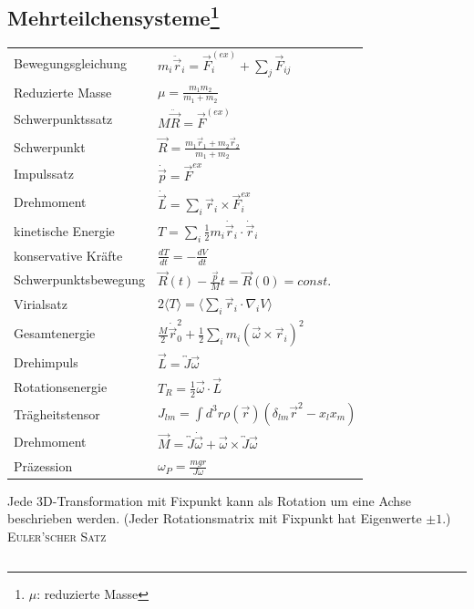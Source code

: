 \documentclass[12pt,a4paper]{article}
\renewcommand{\d}[2]{\frac{d #1}{d #2}}
\renewcommand{\=}[1]{\stackrel{#1}{=}}
\theoremstyle{definition}
\theoremstyle{remark}
\begin{document}
\subsection[Mehrteilchensysteme]{Mehrteilchensysteme\let\thefootnote\relax\footnote{$\mu$: reduzierte Masse}}

\begin{center}
\begin{minipage}[t]{.5\linewidth}
\vspace{0pt}
\begin{tabular}{ll}
Bewegungsgleichung & $m_i \ddot{\vec{r}}_i = \vec{F}_i^{(ex)} + \sum_j \vec{F}_{ij}$\\
Reduzierte Masse & $\mu = \frac{m_1 m_2}{m_1 + m_2}$\\
Schwerpunktssatz & $M \ddot{\vec{R}} = \vec{F}^{(ex)}$\\
Schwerpunkt & $\vec{R} = \frac{m_1 \vec{r}_1 + m_2 \vec{r}_2}{m_1 + m_2}$\\
Impulssatz & $\dot{\vec{p}} = \vec{F}^{ex}$\\
Drehmoment & $\dot{\vec{L}} = \sum_i \vec{r}_i \times \vec{F}_i^{ex}$\\
kinetische Energie & $T = \sum_i \frac{1}{2} m_i \dot{\vec{r}}_i \cdot \dot{\vec{r}}_i$\\
konservative Kräfte & $\d{T}{t} = - \d{V}{t}$\\
Schwerpunktsbewegung & $\vec{R}(t) - \frac{\vec{p}}{M}t = \vec{R}(0) = const.$\\
Virialsatz & $2 \langle T \rangle = \langle \sum_i \vec{r}_i \cdot \nabla_i V \rangle$\\
Gesamtenergie & $\frac{M}{2} \dot{\vec{r}}_0^2 + \frac{1}{2} \sum_i m_i (\vec{\omega} \times \vec{r}_i)^2$\\
Drehimpuls & $\vec{L} = \overleftrightarrow{J}\vec{\omega}$\\
Rotationsenergie & $T_R = \frac{1}{2} \vec{\omega} \cdot \vec{L}$\\
Trägheitstensor & $J_{lm} = \int d^3 r \rho(\vec{r}) (\delta_{lm} \vec{r}^2 - x_l x_m)$\\
Drehmoment & $\vec{M} = \overleftrightarrow{J} \dot{\vec{\omega}} + \vec{\omega} \times \overleftrightarrow{J} \vec{\omega}$\\
Präzession & $\omega_P = \frac{m g r}{J \omega}$\\
\end{tabular}
\begin{framed}
Jede 3D-Transformation mit Fixpunkt kann als Rotation um eine Achse beschrieben werden. (Jeder Rotationsmatrix mit Fixpunkt hat Eigenwerte $\pm 1$.)\\
\centering\textsc{Euler'scher Satz}
\end{framed}
\end{minipage}%
\begin{minipage}[t]{.5\linewidth}
\vspace{0pt}
\centering
\begin{tabular}{ll}

\end{tabular}
\end{minipage}
\end{center}
\end{document}
